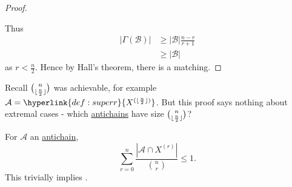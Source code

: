 \documentclass{article}
\DeclarePairedDelimiter\floor{\lfloor}{\rfloor}
\begin{document}
\begin{proof}
\begin{center}
  \end{center}
  Thus
  \begin{align*}
    |\Gamma(\mathcal{B})| &\geq |\mathcal{B}| \frac{n-r}{r+1} \\
                               &\geq |\mathcal{B}|
  \end{align*}
  as $r < \frac{n}{2}$.
  Hence by Hall's theorem, there is a matching.
\end{proof}

\begin{remark}
  Recall $\binom{n}{\floor{\frac{n}{2}}}$ was achievable, for example $\mathcal{A} = \hyperlink{def:superr}{X^{(\floor{\frac{n}{2}})}}$.
  But this proof says nothing about extremal cases - which \hyperlink{def:antichain}{antichains} have size $\binom{n}{\floor{\frac{n}{2}}}$?
\end{remark}

\begin{aim}
  For $\mathcal{A}$ an \hyperlink{def:antichain}{antichain},
  \begin{equation*}
    \sum_{r=0}^n \frac{|\mathcal{A} \cap X^{(r)}|}{\binom{n}{r}} \leq 1.
  \end{equation*}
  This trivially implies .
\end{aim}
\end{document}
